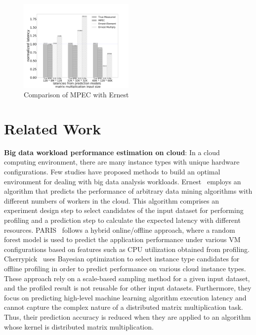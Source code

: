 \documentclass[10pt, conference, compsocconf]{IEEEtran}
\begin{document}
\begin{figure}[t]
	\centering\includegraphics[width=0.5\textwidth]{figures/MPC-Ernest-compare.pdf}\caption{Comparison of MPEC with Ernest}\label{fig:mpc-ernest}
\end{figure}

\section{Related Work}\label{sec:relatedwork}
\textbf{Big data workload performance estimation on cloud}: In a cloud computing environment, there are many instance types with unique hardware configurations. Few studies have proposed methods to build an optimal environment for dealing with big data analysis  workloads. Ernest~\cite{ernest} employs an algorithm that predicts the performance of arbitrary data mining algorithms with different numbers of workers in the cloud. This algorithm comprises an experiment design step to select candidates of the input dataset for performing profiling and a prediction step to calculate the expected latency with different resources. PARIS~\cite{paris} follows a hybrid online/offline approach, where a random forest model is used to predict the application performance under various VM configurations based on features such as CPU utilization obtained from profiling. Cherrypick~\cite{cherrypick} uses Bayesian optimization to select instance type candidates for offline profiling in order to predict performance on various cloud instance types. These approach rely on a scale-based sampling method for a given input dataset, and the profiled result is not reusable for other input datasets. Furthermore, they focus on predicting high-level machine learning algorithm execution latency and cannot capture the complex nature of a distributed matrix multiplication task. Thus, their prediction accuracy is reduced when they are applied to an algorithm whose kernel is distributed matrix multiplication.
\end{document}
